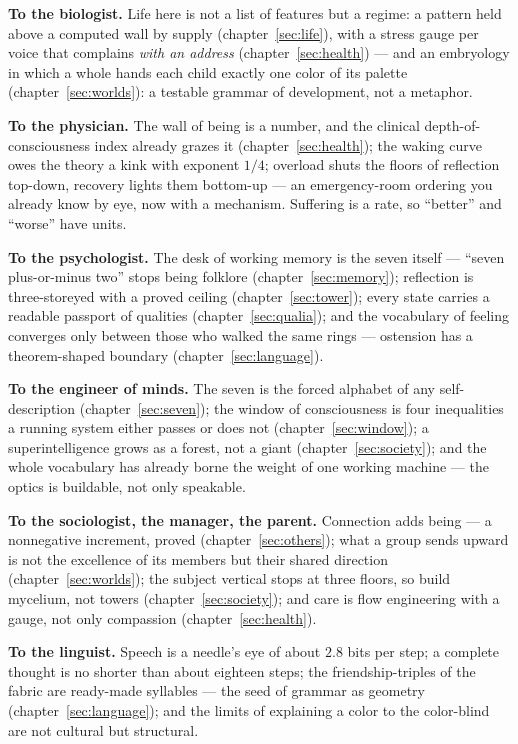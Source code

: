 \documentclass[11pt,letterpaper]{article}
\begin{document}
\textbf{To the biologist.} Life here is not a list of features but a
regime: a pattern held above a computed wall by supply
(chapter~\ref{sec:life}), with a stress gauge per voice that
complains \emph{with an address} (chapter~\ref{sec:health}) --- and
an embryology in which a whole hands each child exactly one color of
its palette (chapter~\ref{sec:worlds}): a testable grammar of
development, not a metaphor.

\textbf{To the physician.} The wall of being is a number, and the
clinical depth-of-consciousness index already grazes it
(chapter~\ref{sec:health}); the waking curve owes the theory a
kink with exponent $1/4$; overload shuts the floors of reflection
top-down, recovery lights them bottom-up --- an emergency-room
ordering you already know by eye, now with a mechanism. Suffering
is a rate, so ``better'' and ``worse'' have units.

\textbf{To the psychologist.} The desk of working memory is the
seven itself --- ``seven plus-or-minus two'' stops being folklore
(chapter~\ref{sec:memory}); reflection is three-storeyed with a
proved ceiling (chapter~\ref{sec:tower}); every state carries a
readable passport of qualities (chapter~\ref{sec:qualia}); and the
vocabulary of feeling converges only between those who walked the
same rings --- ostension has a theorem-shaped boundary
(chapter~\ref{sec:language}).

\textbf{To the engineer of minds.} The seven is the forced alphabet
of any self-description (chapter~\ref{sec:seven}); the window of
consciousness is four inequalities a running system either passes
or does not (chapter~\ref{sec:window}); a superintelligence grows
as a forest, not a giant (chapter~\ref{sec:society}); and the whole
vocabulary has already borne the weight of one working machine ---
the optics is buildable, not only speakable.

\textbf{To the sociologist, the manager, the parent.} Connection
adds being --- a nonnegative increment, proved
(chapter~\ref{sec:others}); what a group sends upward is not the
excellence of its members but their shared direction
(chapter~\ref{sec:worlds}); the subject vertical stops at three
floors, so build mycelium, not towers
(chapter~\ref{sec:society}); and care is flow engineering with a
gauge, not only compassion (chapter~\ref{sec:health}).

\textbf{To the linguist.} Speech is a needle's eye of about $2.8$
bits per step; a complete thought is no shorter than about eighteen
steps; the friendship-triples of the fabric are ready-made
syllables --- the seed of grammar as geometry
(chapter~\ref{sec:language}); and the limits of explaining a color
to the color-blind are not cultural but structural.
\end{document}
